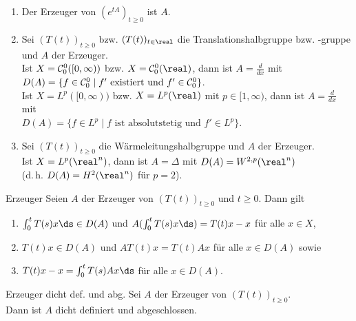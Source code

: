 \begin{Bsp}
    \begin{enumerate}[label=\emph{(\alph*)}]
        \item
        Der Erzeuger von $(e^{tA})_{t \ge 0}$ ist $A$.

        \item
        Sei $(T(t))_{t \ge 0}$ bzw. $(T(t))_{t \in \real}$ die Translationshalbgruppe bzw. -gruppe
        und $A$ der Erzeuger.\\
        Ist $X = \mathcal{C}^0_0([0, \infty))$ bzw. $X = \C^0_0(\real)$, dann ist
        $A = \frac{d}{dx}$ mit\\
        $D(A) = \{f \in \mathcal{C}^0_0 \;|\; \text{$f'$ existiert und $f' \in \mathcal{C}^0_0$}\}$.\\
        Ist $X = L^p([0, \infty))$ bzw. $X = L^p(\real)$ mit $p \in [1, \infty)$, dann ist
        $A = \frac{d}{dx}$ mit\\
        $D(A) = \{f \in L^p \;|\; \text{$f$ ist absolutstetig und $f' \in L^p$}\}$.

        \item
        Sei $(T(t))_{t \ge 0}$ die Wärmeleitungshalbgruppe und $A$ der Erzeuger.\\
        Ist $X = L^p(\real^n)$, dann ist $A = \Delta$ mit
        $D(A) = W^{2,p}(\real^n)$\\
        (d.\,h. $D(A) = H^2(\real^n)$ für $p = 2$).
    \end{enumerate}
\end{Bsp}

\linie

\begin{Lemma}{Erzeuger}
    Seien $A$ der Erzeuger von $(T(t))_{t \ge 0}$ und $t \ge 0$.
    Dann gilt
    \begin{enumerate}
        \item
        $\int_0^t T(s) x\ds \in D(A)$ und
        $A(\int_0^t T(s) x\ds) = T(t) x - x$ für alle $x \in X$,

        \item
        $T(t) x \in D(A)$ und $A T(t) x = T(t) A x$ für alle $x \in D(A)$ sowie

        \item
        $T(t) x - x = \int_0^t T(s) Ax\ds$ für alle $x \in D(A)$.
    \end{enumerate}
\end{Lemma}

\begin{Satz}{Erzeuger dicht def. und abg.}
    Sei $A$ der Erzeuger von $(T(t))_{t \ge 0}$.\\
    Dann ist $A$ dicht definiert und abgeschlossen.
\end{Satz}


